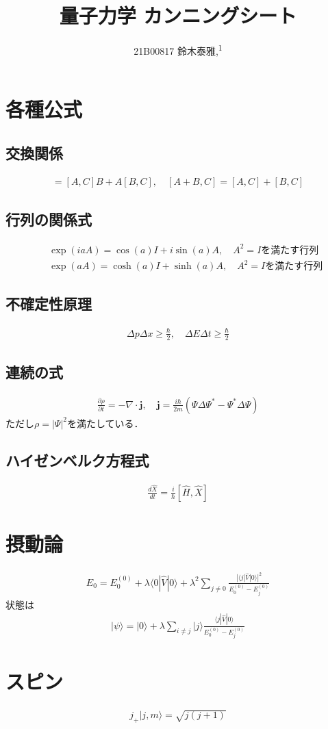 \documentclass[12pt,dvipdfmx]{jsarticle}
\newcommand\authormark[1]{\textsuperscript{#1}}
\begin{document}
\title{量子力学 カンニングシート}

\author{21B00817 鈴木泰雅,\authormark{1}}
\section*{\Large{各種公式}}
\subsection*{交換関係}
\begin{eqnarray}
  [AB,C] = [A,C]B + A[B,C],\quad [A+B,C] = [A,C] + [B,C]
\end{eqnarray}
\subsection*{行列の関係式}
\begin{eqnarray}
  &&\exp(iaA) = \cos(a)I +i\sin(a)A,\quad A^2 =I を満たす行列\\
  &&\exp(aA) = \cosh(a)I +\sinh(a)A,\quad A^2 =I を満たす行列
\end{eqnarray}
\subsection*{不確定性原理}
\begin{eqnarray}
  \Delta p\Delta x \geq \frac{\hbar}{2},\quad \Delta E\Delta t \geq\frac{\hbar}{2}
\end{eqnarray}
\subsection*{連続の式}
\begin{eqnarray}
  \frac{\partial\rho}{\partial t} = -\nabla\cdot\bm{j},\quad \bm{j} = \frac{i\hbar}{2m}\left( \Psi\Delta\Psi^{*}-\Psi^{*}\Delta\Psi \right)
\end{eqnarray}
ただし$\rho=|\Psi|^2$を満たしている．
\subsection*{ハイゼンベルク方程式}
\begin{eqnarray}
  \frac{d\hat{X}}{dt}  = \frac{i}{\hbar}\left[ \hat{H}, \hat{X} \right]
\end{eqnarray}
\section*{\Large{摂動論}}
\begin{eqnarray}
  E_0 = E_0^{(0)}+ \lambda\langle 0|\hat{V}|0\rangle + \lambda^2 \sum_{j\neq 0}\frac{|\langle j|\hat{V}|0\rangle|^2}{E_0^{(0)}-E_j^{(0)}}
\end{eqnarray}
状態は
\begin{eqnarray}
  |\psi\rangle = |0\rangle + \lambda\sum_{i\neq j}|j\rangle \frac{\langle j|\hat{V}|0\rangle}{E_0^{(0)}-E_j^{(0)}}
\end{eqnarray}
\section*{\Large{スピン}}
\begin{eqnarray}
  j_+|j,m\rangle= \sqrt{ j(j+1) }
\end{eqnarray}
\end{document}
